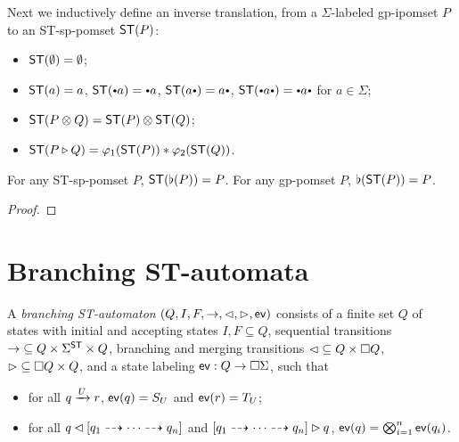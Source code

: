 \documentclass[a4paper,english]{lipics-v2021}
\begin{document}
Next we inductively define an inverse translation,
from a $\Sigma$-labeled gp-ipomset $P$ to an ST-sp-pomset $\textup{\textsf{ST}}(P)$:
\begin{itemize}
\item $\textup{\textsf{ST}}(\emptyset)=\emptyset$; 
\item $\textup{\textsf{ST}}(a)=a$,  $\ST(\ibullet a)=\ibullet a$, $\ST(a\ibullet)=a\ibullet$,  $\ST(\ibullet a\ibullet)=\ibullet a\ibullet$ for $a\in \Sigma$;
\item $\textup{\textsf{ST}}(P\otimes Q)=\textup{\textsf{ST}}(P)\otimes \textup{\textsf{ST}}(Q)$;
\item $\textup{\textsf{ST}}(P\mathbin{\triangleright} Q)=\varphi_1(\textup{\textsf{ST}}(P))*\varphi_2(\textup{\textsf{ST}}(Q))$.
\end{itemize}


\begin{proposition}
  \qquad
  For any ST-sp-pomset $P$, $\textup{\textsf{ST}}(\flat(P))=P$.
  For any gp-pomset $P$, $\flat(\textup{\textsf{ST}}(P))=P$.
\end{proposition}

\begin{proof}
\end{proof}

\section{Branching ST-automata}


\begin{definition}
  A \emph{branching ST-automaton} $(Q, I, F, {\to}, {\mathbin{\lhd}}, {\mathbin{\rhd}}, \textup{\textsf{ev}})$
  consists of a finite set $Q$ of states with initial and accepting states $I, F\subseteq Q$,
  sequential transitions ${\to}\subseteq Q\times \Sigma^{\textup{\textsf{ST}}}\times Q$,
  branching and merging transitions ${\mathbin{\lhd}}\subseteq Q\times \square Q$, ${\mathbin{\rhd}}\subseteq \square Q\times Q$,
  and a state labeling $\textup{\textsf{ev}}: Q\to \square \Sigma$, such that
  \begin{itemize}
  \item for all $q\xrightarrow{U} r$, $\textup{\textsf{ev}}(q)=S_U$ and $\textup{\textsf{ev}}(r)=T_U$;
  \item for all $q\mathbin{\lhd} [q_1\dashrightarrow\dotsm\dashrightarrow q_n]$ and $[q_1\dashrightarrow\dotsm\dashrightarrow q_n]\mathbin{\rhd} q$, $\textup{\textsf{ev}}(q)=\bigotimes_{i=1}^n \textup{\textsf{ev}}(q_i)$.
  \end{itemize}
\end{definition}
\end{document}
